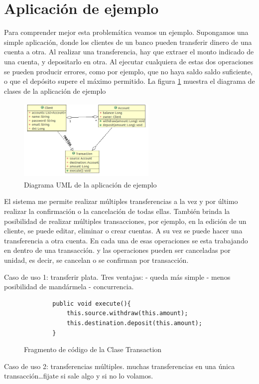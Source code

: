 \section{Aplicación de ejemplo}

Para comprender mejor esta problemática veamos un ejemplo. Supongamos una simple
aplicación, donde los clientes de un banco pueden transferir dinero de
una cuenta a otra. Al realizar una transferencia, hay que extraer el monto
indicado de una cuenta, y depositarlo en otra. 
Al ejecutar cualquiera de estas dos operaciones se pueden producir errores,
como por ejemplo, que no haya saldo saldo suficiente, o que el depósito supere
el máximo permitido.
La  figura \ref{example} muestra el diagrama de clases de la aplicación de
ejemplo

\medskip
	\begin{figure}[h]
		\centering
		\includegraphics[width=250px, height=150px]{img/transaccion}
		\caption{Diagrama UML de la aplicación de ejemplo}
		\label{example}
	\end{figure}	


El sistema me permite realizar múltiples transferencias a la vez y por último
realizar la confirmación o la cancelación de todas ellas. También brinda la posibilidad
de realizar múltiples transacciones, por ejemplo, en la edición de un cliente,
se puede editar, eliminar o crear cuentas. A su vez se puede hacer una
transferencia a otra cuenta. En cada una de esas operaciones se esta
trabajando en dentro de una transacción. y las operaciones pueden ser
canceladas por unidad, es decir, se cancelan o se confirman por transacción.


Caso de uso 1: transferir plata.
Tres ventajas:
- queda más simple
- menos posibilidad de mandármela
- concurrencia.

\begin{figure}[h]
	\begin{lstlisting}
		public void execute(){
			this.source.withdraw(this.amount);
			this.destination.deposit(this.amount);
		}
	\end{lstlisting}
	\caption{Fragmento de código de la Clase Transaction}
	\label{executeTransaction}
\end{figure}

Caso de uso 2: transferencias múltiples.
muchas transferencias en una única transacción\ldots fijate si sale algo y si no
lo volamos.